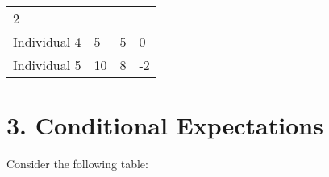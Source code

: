 \documentclass[]{article}
\begin{document}
\begin{longtable}[]{@{}llll@{}}
\begin{minipage}[t]{0.16\columnwidth}
2\strut
\end{minipage}\tabularnewline
\begin{minipage}[t]{0.20\columnwidth}\raggedright\strut
Individual 4\strut
\end{minipage} & \begin{minipage}[t]{0.16\columnwidth}\raggedright\strut
5\strut
\end{minipage} & \begin{minipage}[t]{0.16\columnwidth}\raggedright\strut
5\strut
\end{minipage} & \begin{minipage}[t]{0.16\columnwidth}\raggedright\strut
0\strut
\end{minipage}\tabularnewline
\begin{minipage}[t]{0.20\columnwidth}\raggedright\strut
Individual 5\strut
\end{minipage} & \begin{minipage}[t]{0.16\columnwidth}\raggedright\strut
10\strut
\end{minipage} & \begin{minipage}[t]{0.16\columnwidth}\raggedright\strut
8\strut
\end{minipage} & \begin{minipage}[t]{0.16\columnwidth}\raggedright\strut
-2\strut
\end{minipage}\tabularnewline
\bottomrule
\end{longtable}

\section{3. Conditional Expectations}\label{conditional-expectations}

Consider the following table:
\end{document}
